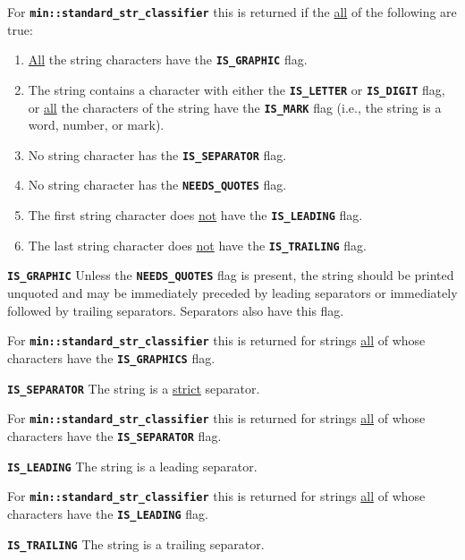 \documentclass[12pt]{article}
\makeatletter
\newcommand{\TT}[1]{{\tt \bfseries #1}}
\newcommand{\ttmkey}[2]{\TT{#1}\index{#1@{\tt #1}!#2}}
\newcommand{\EOL}{\penalty \exhyphenpenalty}
\newenvironment{itemlist}[1][1.2in]%
	{\begin{list}{}{\setlength{\labelwidth}{#1}%
		        \setlength{\leftmargin}{\labelwidth}%
		        \addtolength{\leftmargin}{+0.2in}%
		        \renewcommand{\makelabel}[1]{##1\hfill}}}%
	{\end{list}}
\makeatother
\begin{document}
\begin{itemlist}[1.5in]
For \TT{min::\EOL standard\_\EOL str\_\EOL classifier} this is returned
if the \underline{all} of the following are true:
\begin{enumerate}
\item
\underline{All} the string characters have the \TT{IS\_\EOL GRAPHIC} flag.
\item
The string contains a character with either the \TT{IS\_\EOL LETTER}
or \TT{IS\_\EOL DIGIT} flag, or \underline{all} the characters of
the string have the \TT{IS\_\EOL MARK} flag (i.e., the string is
a word, number, or mark).
\item
No string character has the \TT{IS\_\EOL SEPARATOR} flag.
\item
No string character has the \TT{NEEDS\_\EOL QUOTES} flag.
\item
The first string character does \underline{not} have the
\TT{IS\_\EOL LEADING} flag.
\item
The last string character does \underline{not} have the
\TT{IS\_\EOL TRAILING} flag.
\end{enumerate}

\item[\ttmkey{IS\_GRAPHIC}{{\tt min::str\_classifier} flag}]%
\label{IS_GRAPHIC_CLASSIFIER}
Unless the \TT{NEEDS\_QUOTES} flag is present, the string should
be printed unquoted and may be immediately preceded by leading
separators or immediately followed by trailing separators.
Separators also have this flag.

For \TT{min::\EOL standard\_\EOL str\_\EOL classifier} this is
returned for strings \underline{all} of whose characters
have the \TT{IS\_\EOL GRAPHICS} flag.

\item[\ttmkey{IS\_SEPARATOR}{{\tt min::str\_classifier} flag}]%
\label{IS_SEPARATOR_CLASSIFIER}
The string is a \underline{strict} separator.

For \TT{min::\EOL standard\_\EOL str\_\EOL classifier} this is
returned for strings \underline{all} of whose characters
have the \TT{IS\_\EOL SEPARATOR} flag.

\item[\ttmkey{IS\_LEADING}{{\tt min::str\_classifier} flag}]%
\label{IS_LEADING_CLASSIFIER}
The string is a leading separator.

For \TT{min::\EOL standard\_\EOL str\_\EOL classifier}
this is returned for strings \underline{all} of whose characters
have the \TT{IS\_\EOL LEADING} flag.

\item[\ttmkey{IS\_TRAILING}{{\tt min::str\_classifier} flag}]%
\label{IS_TRAILING_CLASSIFIER}
The string is a trailing separator.


\end{itemlist}
\end{document}
